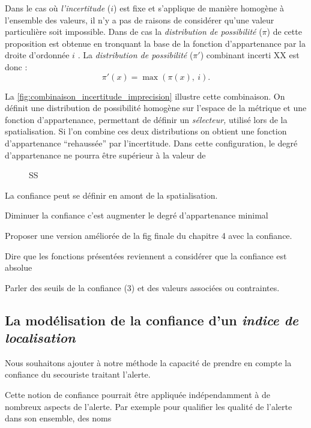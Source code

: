 Dans le cas où \emph{l'incertitude} (\(i\)) est fixe et s'applique de
manière homogène à l'ensemble des valeurs, il n'y a pas de raisons de
considérer qu'une valeur particulière soit impossible. Dans de cas la
\emph{distribution de possibilité} (\(π\)) de cette proposition est
obtenue en tronquant la base de la fonction d'appartenance par la
droite d'ordonnée \(i\) \autocite{Bouchon-Meunier2007}. La
\emph{distribution de possibilité} (\(π'\)) combinant incerti XX est
donc :
%
\begin{equation}
  π'(x) = \max(π(x),\ i).  
\end{equation}




La \autoref{fig:combinaison_incertitude_imprecision} illustre cette
combinaison. On définit une distribution de possibilité homogène sur
l'espace de la métrique et une fonction d'appartenance, permettant de
définir un \emph{sélecteur,} utilisé lors de la spatialisation. Si
l'on combine ces deux distributions on obtient une fonction
d'appartenance \enquote{rehaussée} par l'incertitude. Dans cette
configuration, le degré d'appartenance ne pourra être supérieur à la
valeur de 

\begin{figure}
  \centering
  
  \caption{SS}
  \label{fig:combinaison_incertitude_imprecision}
\end{figure}


La confiance peut se définir en amont de la spatialisation.

Diminuer la confiance c'est augmenter le degré d'appartenance minimal

Proposer une version améliorée de la fig finale du chapitre 4 avec la
confiance.

Dire que les fonctions présentées reviennent a considérer que la
confiance est absolue

Parler des seuils de la confiance (3) et des valeurs associées ou
contraintes.


\subsection{La modélisation de la confiance d'un \emph{indice de
    localisation}}

Nous souhaitons ajouter à notre méthode la capacité de prendre en
compte la confiance du secouriste traitant l'alerte.

Cette notion de confiance pourrait être appliquée indépendamment à de
nombreux aspects de l'alerte. Par exemple pour qualifier les qualité
de l'alerte dans son ensemble, des noms 


